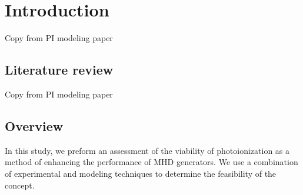 

\section{Introduction}

Copy from PI modeling paper

\subsection{Literature review}

Copy from PI modeling paper

\subsection{Overview}

In this study, we preform an assessment of the viability of photoionization as a method of enhancing the performance of MHD generators. We use a combination of experimental and modeling techniques to determine the feasibility of the concept.



